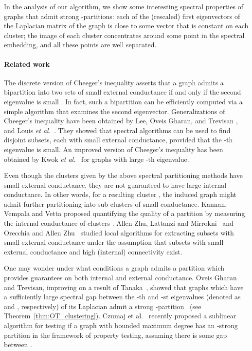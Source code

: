 \documentclass[11pt]{article}
\theoremstyle{plain}
\newcommand{\etal}{\emph{et al.}}
\begin{document}
In the analysis of our algorithm, we show some interesting spectral properties
of graphs that admit strong -partitions: each of the (rescaled) first 
eigenvectors of the Laplacian matrix of the graph is close to some vector that
is constant on each cluster; the image of each cluster concentrates around some
point in the spectral embedding, and all these points are well separated.

\paragraph*{Related work} The discrete version of Cheeger's inequality
asserts that a graph admits a bipartition into two sets of small external
conductance if and only if the second eigenvalue is small
\cite{DBLP:journals/combinatorica/Alon86, DBLP:journals/jct/AlonM85, cheeger,
DBLP:conf/focs/Mihail89, DBLP:journals/iandc/SinclairJ89}. In fact, such a
bipartition can be efficiently computed via a simple algorithm that examines the
second eigenvector. Generalizations of Cheeger's inequality have been obtained
by Lee, Oveis Gharan, and Trevisan \cite{DBLP:conf/stoc/LeeGT12}, and Louis
\etal~\cite{DBLP:conf/stoc/LouisRTV12}. They showed that spectral algorithms can
be used to find  disjoint subsets, each with small external conductance,
provided that the -th eigenvalue is small. An improved version of Cheeger's
inequality has been obtained by Kwok \etal~\cite{DBLP:conf/stoc/KwokLLGT13} for
graphs with large -th eigenvalue.

Even though the clusters given by the above spectral partitioning methods have
small external conductance, they are not guaranteed to have large internal
conductance. In other words, for a resulting cluster , the induced graph
 might admit further partitioning into sub-clusters of small conductance.
Kannan, Vempala and Vetta proposed quantifying the quality of a partition by
measuring the internal conductance of clusters
\cite{DBLP:journals/jacm/KannanVV04}. Allen Zhu, Lattanzi and
Mirrokni~\cite{DBLP:conf/icml/ZhuLM13} and Orecchia and Allen Zhu~\cite{DBLP:conf/soda/OrecchiaZ14}
studied local algorithms for extracting subsets with small external conductance
under the assumption that subsets with small external conductance and high
(internal) connectivity exist.

One may wonder under what conditions a graph admits a partition which provides
guarantees on both internal and external conductance. Oveis Gharan and Trevisan,
improving on a result of Tanaka~\cite{Tanaka:2011vk}, showed that graphs which
have a sufficiently large spectral gap between the -th and -st
eigenvalues (denoted as  and , respectively) of its
Laplacian admit a strong -partition~\cite{DBLP:conf/soda/GharanT14} (see
Theorem~\ref{thm:OT_clustering}). Czumaj et al.~\cite{DBLP:conf/stoc/CzumajPS15} recently
proposed a sublinear algorithm for testing if a graph with bounded maximum
degree has an -strong partition in the
framework of property testing, assuming there is some gap between
.
\end{document}

